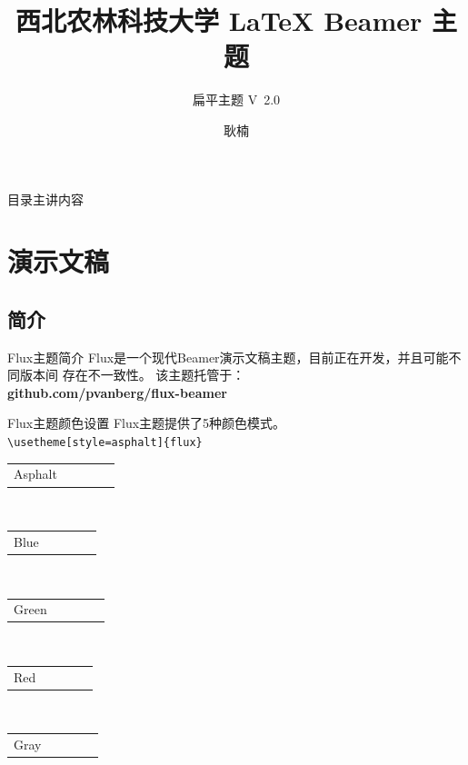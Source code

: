 \documentclass[t, aspectratio=169]{ctexbeamer}
\title[Flux Beamer 主题] %
{西北农林科技大学 {\LaTeX}  Beamer 主题}
\subtitle{扁平主题 V\ 2.0}
\date{\tosemester} %
\author[N. Geng] %
{耿楠}
\institute[
CS of CIE] %
{%
  \cie
}
\begin{document}
\titlepage
\begin{frame}{目录}{主讲内容}
 \tableofcontents
\end{frame}

\section{演示文稿}

\subsection{简介}

\begin{frame}{Flux主题}{简介}
  \justifying
  Flux是一个现代Beamer演示文稿主题，目前正在开发，并且可能不同版本间
  存在不一致性。 该主题托管于：\\[0.3cm]
  \centering\textbf{github.com/pvanberg/flux-beamer}
\end{frame}

\def\beamer@mytheme@style{green}
\begin{frame}[fragile]{Flux主题}{颜色设置}
  \centering
  Flux主题提供了5种颜色模式。\\
  \verb+\usetheme[style=asphalt]{flux}+\\[0.8cm]
  \newcommand{\colorRow}[1]{
    \begin{tabular}{p{4cm}cccc}
      #1 & \cellcolor{primary}\hspace*{1cm} &\cellcolor{primaryLight}\hspace*{1cm}&\cellcolor{secondary}\hspace*{1cm}&\cellcolor{tertiary}\hspace*{1cm}\\
    \end{tabular}
  }
  \colorRow{Asphalt}\\[0.3cm]
  \colorRow{Blue}\\[0.3cm]
  \colorRow{Green}\\[0.3cm]
  \colorRow{Red}\\[0.3cm]
  \colorRow{Gray}\\[0.3cm]
\end{frame}
\end{document}
